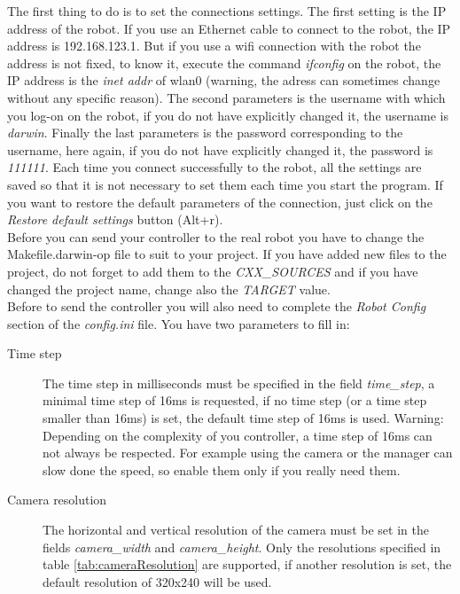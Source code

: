 \documentclass[a4paper, 12pt]{article}  		%
\begin{document}
The first thing to do is to set the connections settings. The first setting is the IP address of the robot. If you use an Ethernet cable to connect to the robot, the IP address is 192.168.123.1. But if you use a wifi connection with the robot the address is not fixed, to know it, execute the command \textit{ifconfig} on the robot, the IP address is the \textit{inet addr} of wlan0 (warning, the adress can sometimes change without any specific reason). The second parameters is the username with which you log-on on the robot, if you do not have explicitly changed it, the username is \textit{darwin}. Finally the last parameters is the password corresponding to the username, here again, if you do not have explicitly changed it, the password is \textit{111111}. Each time you connect successfully to the robot, all the settings are saved so that it is not necessary to set them each time you start the program. If you want to restore the default parameters of the connection, just click on the \textit{Restore default settings} button (Alt+r).\\

Before you can send your controller to the real robot you have to change the Makefile.darwin-op file to suit to your project. If you have added new files to the project, do not forget to add them to the \textit{CXX\_SOURCES} and if you have changed the project name, change also the \textit{TARGET} value.\\

\newpage
Before to send the controller you will also need to complete the \textit{Robot Config} section of the \textit{config.ini} file. You have two parameters to fill in:
\begin{description}
\item[Time step] The time step in milliseconds must be specified in the field \textit{time\_step}, a minimal time step of 16ms is requested, if no time step (or a time step smaller than 16ms) is set, the default time step of 16ms is used. Warning: Depending on the complexity of you controller, a time step of 16ms can not always be respected. For example using the camera or the manager can slow done the speed, so enable them only if you really need them.\\
\item[Camera resolution] The horizontal and vertical resolution of the camera must be set in the fields \textit{camera\_width} and \textit{camera\_height}. Only the resolutions specified in table \ref{tab:cameraResolution} are supported, if another resolution is set, the default resolution of 320x240 will be used.\\
\end{description}
\end{document}
